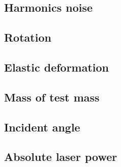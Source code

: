 \subsection{Harmonics noise}
\subsection{Rotation}
\subsection{Elastic deformation}
\subsection{Mass of test mass}
\subsection{Incident angle}
\subsection{Absolute laser power}
